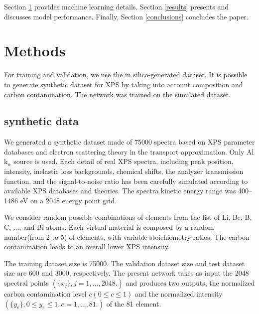 \documentclass[preprint,aps,floatfix,showpacs]{revtex4-2}
\begin{document}
Section \ref{methods} provides machine learning details. Section \ref{results} presents and discusses model performance. 
Finally, Section \ref{conclusions} concludes the paper.

\section{Methods} \label{methods}
For training and validation, we use the in silico-generated dataset. 
It is possible to generate synthetic dataset for XPS by taking into account composition and carbon contamination. 
The network was trained on the simulated dataset.


\subsection{synthetic data}
We generated a synthetic dataset made of 75000 spectra based on XPS parameter databases and electron scattering theory in the transport approximation\cite{werner2001electron}. 
Only Al k$_{\alpha}$ source is used.
Each detail of real XPS spectra, including peak position, intensity, inelastic loss backgrounds, chemical shifts, the analyzer transmission function, and the signal-to-noise ratio has been carefully simulated according to available XPS databases and theories.
The spectra kinetic energy range was 400–1486 eV on a 2048 energy point grid. 

We consider random possible combinations of elements 
from the list of Li, Be, B, C, ..., and Bi atoms. 
Each virtual material is composed by a random number(from 2 to 5) of elements, with variable stoichiometry ratios.
The carbon contamination leads to an overall lower XPS intensity\cite{evans1997correction}.

The training dataset size is 75000.
The validation dataset size and test dataset size are 600 and  3000, respectively.
The present network takes as input the 2048 spectral points $(\{x_j\}, j = 1, \ldots, 2048.)$ and produces two outputs, the normalized carbon contamination level $c (0 \le c \le 1)$ and the normalized intensity $(\{y_e\}, 0 \le y_e \le 1, e = 1, \ldots, 81.)$ of the 81 element.
\end{document}

